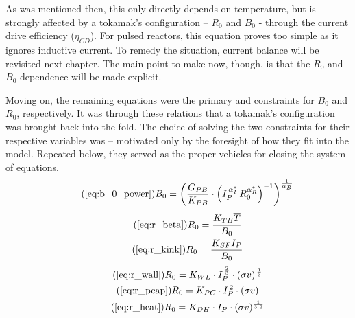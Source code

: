 As was mentioned then, this only directly depends on temperature, but is strongly affected by a tokamak's configuration -- $R_0$ and $B_0$ - through the current drive efficiency ($\eta_{CD}$). For pulsed reactors, this equation proves too simple as it ignores inductive current. To remedy the situation, current balance will be revisited next chapter. The main point to make now, though, is that the $R_0$ and $B_0$ dependence will be made explicit.

Moving on, the remaining equations were the primary and  constraints for $B_0$ and $R_0$, respectively. It was through these relations that a tokamak's configuration was brought back into the fold. The choice of solving the two constraints for their respective variables was  -- motivated only by the foresight of how they fit into the model. Repeated below, they served as the proper vehicles for closing the system of equations. 
\begin{equation}
	\tag{\ref{eq:b_0_power}}
	B_0 = \left( \frac{ G_{PB} }{ K_{PB} } \cdot \left( I_P^{\,\alpha_I^*} \, R_0^{ \alpha_R^* } \right)^{-1} \right) ^ { \frac{1}{ \alpha_B } }
\end{equation}
\begin{gather}
  \tag{\ref{eq:r_beta}}
  R_0 = \frac{ K_{TB} \overline{T} }{ B_0 } \\
	\tag{\ref{eq:r_kink}}
   R_0 = \frac{ K_{SF} I_P }{ B_0 }
\end{gather}
\begin{gather}
	\tag{\ref{eq:r_wall}}
	R_0 = K_{WL} \cdot I_P^{ \, \frac{2}{3} } \cdot (\sigma v) ^{ \, \frac{1}{3} } \\
	\tag{\ref{eq:r_pcap}}
	R_0 = K_{PC} \cdot I_P^{\,2} \cdot (\sigma v) \\
	\tag{\ref{eq:r_heat}}
	R_0 = K_{DH} \cdot I_P \cdot (\sigma v)^ {\frac{1}{3.2}}
\end{gather}

%
